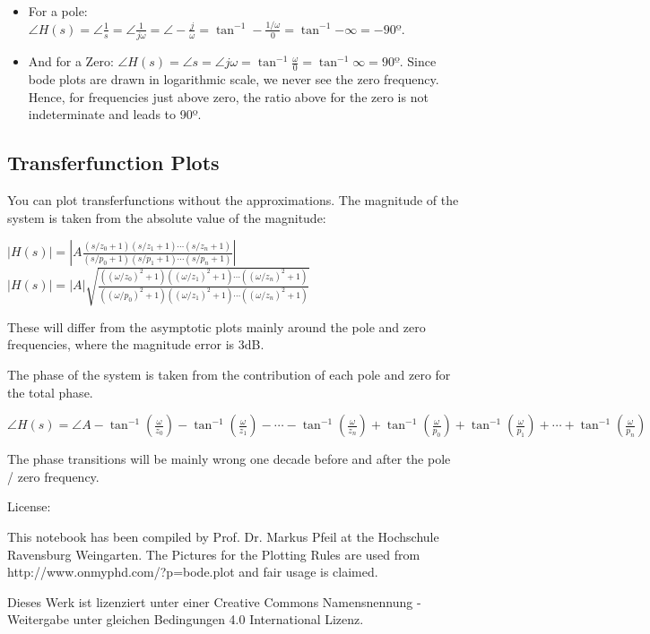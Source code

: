 \documentclass[11pt]{article}
\providecommand{\tightlist}{%
      \setlength{\itemsep}{0pt}\setlength{\parskip}{0pt}}
\begin{document}
\begin{itemize}
\tightlist
\item
  For a pole:
  \(\angle H(s) = \angle \frac{1}{s} = \angle \frac{1}{j\omega} = \angle -\frac{j}{\omega} = \tan^{-1} -\frac{1/\omega}{0} = \tan^{-1}{-\infty} = -90º\).
\item
  And for a Zero:
  \(\angle H(s) = \angle s = \angle j\omega = \tan^{-1} \frac{\omega}{0} = \tan^{-1}{\infty} = 90º\).
  Since bode plots are drawn in logarithmic scale, we never see the zero
  frequency. Hence, for frequencies just above zero, the ratio above for
  the zero is not indeterminate and leads to 90º.
\end{itemize}

\subsection{Transferfunction Plots}\label{transferfunction-plots}

You can plot transferfunctions without the approximations. The magnitude
of the system is taken from the absolute value of the magnitude:

\(|H(s)| = \left|A\frac{(s/z_0 + 1)(s/z_1 + 1)\cdots(s/z_n + 1)}{(s/p_0 + 1)(s/p_1 + 1)\cdots(s/p_n + 1)} \right|\)
\(|H(s)| = |A|\sqrt{\frac{((\omega/z_0)^2 + 1)((\omega/z_1)^2 + 1)\cdots((\omega/z_n)^2 + 1)}{((\omega/p_0)^2 + 1)((\omega/z_1)^2 + 1)\cdots((\omega/z_n)^2 + 1)}}\)

These will differ from the asymptotic plots mainly around the pole and
zero frequencies, where the magnitude error is 3dB.

The phase of the system is taken from the contribution of each pole and
zero for the total phase.

\(\angle H(s) = \angle A - \tan^{-1}(\frac{\omega}{z_0}) - \tan^{-1}(\frac{\omega}{z_1}) - \cdots - \tan^{-1}(\frac{\omega}{z_n}) + \tan^{-1}(\frac{\omega}{p_0}) + \tan^{-1}(\frac{\omega}{p_1}) + \cdots + \tan^{-1}(\frac{\omega}{p_n})\)

The phase transitions will be mainly wrong one decade before and after
the pole / zero frequency.

    License:

This notebook has been compiled by Prof. Dr. Markus Pfeil at the
Hochschule Ravensburg Weingarten. The Pictures for the Plotting Rules
are used from http://www.onmyphd.com/?p=bode.plot and fair usage is
claimed.

Dieses Werk ist lizenziert unter einer Creative Commons Namensnennung -
Weitergabe unter gleichen Bedingungen 4.0 International Lizenz.


    
    
    
    
\end{document}
